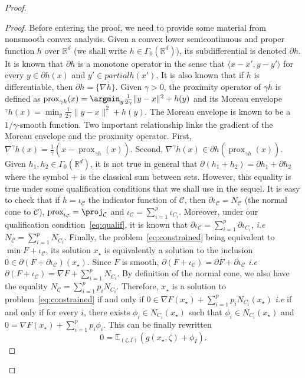 \documentclass{article}
\DeclareMathOperator{\prox}{prox}
\newcommand{\1}{\mathbbm 1}
\newcommand{\bE}{{{\mathbb E}}}
\newcommand{\mC}{{\mathcal C}}
\newcommand{\bR}{{{\mathbb R}}}
\newcommand{\ps}[1]{\langle #1 \rangle}
\theoremstyle{definition}
\begin{document}
\begin{proof}
\begin{proof}
Before entering the proof, we need to provide some material from nonsmooth convex analysis. Given a convex lower semicontinuous and proper function $h$ over $\bR^d$ (we shall write $h \in \Gamma_0(\bR^d)$), its subdifferential is denoted $\partial h$. It is known that $\partial h$ is a monotone operator in the sense that $\ps{x-x',y-y'}$ for every $y \in \partial h(x)$ and $y' \in partial h(x')$. It is also known that if $h$ is differentiable, then $\partial h = \{\nabla h\}$. Given $\gamma >0$, the proximity operator of $\gamma h$ is defined as $\prox_{\gamma h}(x) = \argmin_{y} \frac{1}{2\gamma}\|y - x\|^2 + h(y)$ and its Moreau envelope $^\gamma h(x) = \min_{y} \frac{1}{2\gamma}\|y - x\|^2 + h(y)$. The Moreau envelope is known to be a $1/\gamma$-smooth function. Two important relationship links the gradient of the Moreau envelope and the proximity operator. First, $\nabla ^\gamma h(x) = \frac{1}{\gamma}(x - \prox_{\gamma h}(x))$. Second, $\nabla ^\gamma h(x) \in \partial h(\prox_{\gamma h}(x))$. Given $h_1, h_2 \in \Gamma_0(\bR^d)$, it is not true in general that $\partial (h_1+h_2) = \partial h_1 + \partial h_2$ where the symbol $+$ is the classical sum between sets. However, this equality is true under some qualification conditions that we shall use in the sequel. It is easy to check that if $h = \iota_\mC$ the indicator function of $\mC$, then $\partial \iota_\mC = N_\mC$ (the normal cone to $\mC$), $\prox_{\iota_\mC} = \proj_{\mC}$ and $\iota_\mC = \sum_{i=1}^p \iota_{C_i}$. Moreover, under our qualification condition~\eqref{eq:qualif}, it is known that $\partial \iota_\mC = \sum_{i=1}^p \partial \iota_{C_i}$, \textit{i.e} $N_\mC = \sum_{i=1}^p N_{C_i}$. Finally, the problem~\eqref{eq:constrained} being equivalent to $\min F + \iota_\mC$, its solution $x_\star$ is equivalently a solution to the inclusion $0 \in \partial (F + \partial \iota_\mC)(x_\star)$. Since $F$ is smooth, $\partial (F + \iota_\mC) = \partial F + \partial \iota_\mC$ \textit{i.e} $\partial (F + \iota_\mC) = \nabla F + \sum_{i=1}^p N_{C_i}.$ By definition of the normal cone, we also have the equality $N_\mC = \sum_{i=1}^p p_i N_{C_i}$. Therefore, $x_\star$ is a solution to problem~\eqref{eq:constrained} if and only if $0 \in \nabla F(x_\star) + \sum_{i=1}^p p_i N_{C_i}(x_\star)$ \textit{i.e} if and only if for every $i$, there exists $\phi_i \in N_{C_i}(x_\star)$ such that $\phi_i \in N_{C_i}(x_\star)$ and $0 = \nabla F(x_\star) + \sum_{i=1}^p p_i \phi_i$. This can be finally rewritten 
\begin{equation}
\label{eq:rpz-zero}
0 = \bE_{(\zeta,I)}(g(x_\star,\zeta) + \phi_I).
\end{equation}


\end{proof}
\end{proof}
\end{document}
